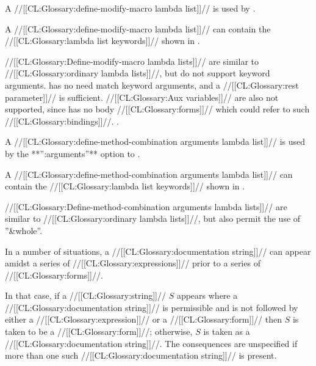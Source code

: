 A //[[CL:Glossary:define-modify-macro lambda list]]// is used by  .

A //[[CL:Glossary:define-modify-macro lambda list]]// can contain the  //[[CL:Glossary:lambda list keywords]]// shown in \thenextfigure.


//[[CL:Glossary:Define-modify-macro lambda lists]]// are similar to  //[[CL:Glossary:ordinary lambda lists]]//, but do not support keyword arguments.  has no need match keyword arguments, and a //[[CL:Glossary:rest parameter]]// is sufficient.  //[[CL:Glossary:Aux variables]]// are also not supported, since  has no body //[[CL:Glossary:forms]]// which could refer to such //[[CL:Glossary:bindings]]//.  .

\endsubsection%

 

A //[[CL:Glossary:define-method-combination arguments lambda list]]// is used by  the **'':arguments''** option to .

A //[[CL:Glossary:define-method-combination arguments lambda list]]// can contain the  //[[CL:Glossary:lambda list keywords]]// shown in \thenextfigure.


//[[CL:Glossary:Define-method-combination arguments lambda lists]]// are similar to  //[[CL:Glossary:ordinary lambda lists]]//, but also permit the use of ''&whole''.

\endsubsection%

 

In a number of situations, a //[[CL:Glossary:documentation string]]// can appear amidst a series of  //[[CL:Glossary:expressions]]// prior to a series of //[[CL:Glossary:forms]]//.

In that case, if a //[[CL:Glossary:string]]// $S$ appears where a //[[CL:Glossary:documentation string]]// is permissible and is not followed by 
  either a  //[[CL:Glossary:expression]]// 
      or a //[[CL:Glossary:form]]// then $S$ is taken to be a //[[CL:Glossary:form]]//; otherwise, $S$ is taken as a //[[CL:Glossary:documentation string]]//. The consequences are unspecified if more than one such //[[CL:Glossary:documentation string]]//  is present.

\endsubsection%
